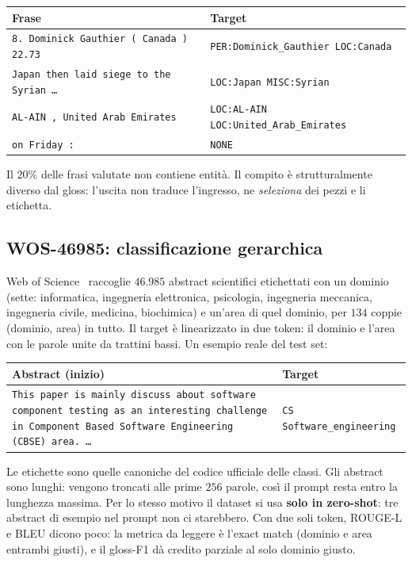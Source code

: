 \begin{center}
\small
\begin{tabular}{ll}
\toprule
Frase & Target \\
\midrule
\texttt{8. Dominick Gauthier ( Canada ) 22.73} & \texttt{PER:Dominick\_Gauthier LOC:Canada} \\
\texttt{Japan then laid siege to the Syrian \dots} & \texttt{LOC:Japan MISC:Syrian} \\
\texttt{AL-AIN , United Arab Emirates} & \texttt{LOC:AL-AIN LOC:United\_Arab\_Emirates} \\
\texttt{on Friday :} & \texttt{NONE} \\
\bottomrule
\end{tabular}
\end{center}

Il $20\%$ delle frasi valutate non contiene entità. Il compito è
strutturalmente diverso dal gloss: l'uscita non traduce l'ingresso, ne
\emph{seleziona} dei pezzi e li etichetta.

\subsection{WOS-46985: classificazione gerarchica}

Web of Science~\cite{kowsari2017hdltex} raccoglie $46.985$ abstract scientifici
etichettati con un dominio (sette: informatica, ingegneria elettronica,
psicologia, ingegneria meccanica, ingegneria civile, medicina, biochimica) e
un'area di quel dominio, per $134$ coppie (dominio, area) in tutto. Il target è
linearizzato in due token: il dominio e l'area con le parole unite da trattini
bassi. Un esempio reale del test set:

\begin{center}
\small
\begin{tabular}{p{}l}
\toprule
Abstract (inizio) & Target \\
\midrule
\texttt{This paper is mainly discuss about software component testing as an
interesting challenge in Component Based Software Engineering (CBSE) area.
\dots} & \texttt{CS Software\_engineering} \\
\bottomrule
\end{tabular}
\end{center}

Le etichette sono quelle canoniche del codice ufficiale delle classi.
Gli abstract sono lunghi: vengono troncati alle prime $256$ parole, così il
prompt resta entro la lunghezza massima. Per lo stesso motivo il dataset si usa
\textbf{solo in zero-shot}: tre abstract di esempio nel prompt non ci
starebbero. Con due soli token, ROUGE-L e BLEU dicono poco: la metrica da
leggere è l'exact match (dominio e area entrambi giusti), e il gloss-F1 dà
credito parziale al solo dominio giusto.


